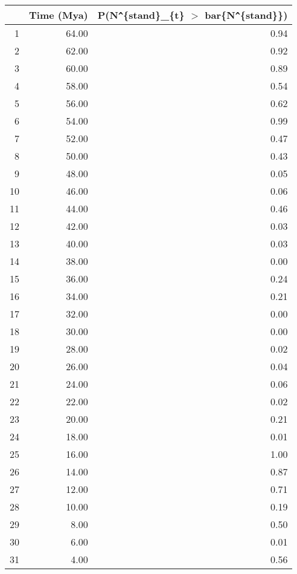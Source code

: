 \begin{table}[ht]
\centering
\begin{tabular}{rrr}
  \hline
 & Time (Mya) & P(N\verb|^|\{stand\}\_\{t\} $>$ bar\{N\verb|^|\{stand\}\}) \\ 
  \hline
1 & 64.00 & 0.94 \\ 
  2 & 62.00 & 0.92 \\ 
  3 & 60.00 & 0.89 \\ 
  4 & 58.00 & 0.54 \\ 
  5 & 56.00 & 0.62 \\ 
  6 & 54.00 & 0.99 \\ 
  7 & 52.00 & 0.47 \\ 
  8 & 50.00 & 0.43 \\ 
  9 & 48.00 & 0.05 \\ 
  10 & 46.00 & 0.06 \\ 
  11 & 44.00 & 0.46 \\ 
  12 & 42.00 & 0.03 \\ 
  13 & 40.00 & 0.03 \\ 
  14 & 38.00 & 0.00 \\ 
  15 & 36.00 & 0.24 \\ 
  16 & 34.00 & 0.21 \\ 
  17 & 32.00 & 0.00 \\ 
  18 & 30.00 & 0.00 \\ 
  19 & 28.00 & 0.02 \\ 
  20 & 26.00 & 0.04 \\ 
  21 & 24.00 & 0.06 \\ 
  22 & 22.00 & 0.02 \\ 
  23 & 20.00 & 0.21 \\ 
  24 & 18.00 & 0.01 \\ 
  25 & 16.00 & 1.00 \\ 
  26 & 14.00 & 0.87 \\ 
  27 & 12.00 & 0.71 \\ 
  28 & 10.00 & 0.19 \\ 
  29 & 8.00 & 0.50 \\ 
  30 & 6.00 & 0.01 \\ 
  31 & 4.00 & 0.56 \\ 
   \hline
\end{tabular}
\label{tab:div_peak}
\end{table}
